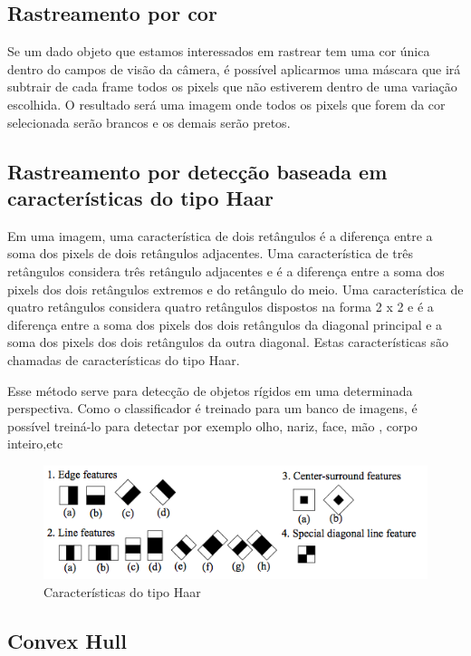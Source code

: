 \subsection{Rastreamento por cor}

Se um dado objeto que estamos interessados em rastrear tem uma cor única dentro
do campos de visão da câmera, é possível aplicarmos uma máscara que irá subtrair
de cada frame todos os pixels que não estiverem dentro de uma variação escolhida.
O resultado será uma imagem onde todos os pixels que forem da cor selecionada
serão brancos e os demais serão pretos.

\subsection{Rastreamento por detecção baseada em características do tipo Haar}

Em uma imagem,  uma característica de dois retângulos é a diferença  entre a soma
dos pixels de dois retângulos adjacentes. Uma característica de três retângulos
considera três retângulo adjacentes e é a diferença entre a soma dos pixels dos
dois retângulos extremos e do retângulo do meio. Uma característica de quatro
retângulos considera quatro retângulos dispostos na forma 2 x 2 e é a diferença
entre a soma dos pixels dos dois retângulos da diagonal principal e a soma dos
pixels dos dois retângulos da outra diagonal. Estas características são chamadas
de características do tipo Haar.

Esse método serve para detecção de objetos rígidos em uma determinada perspectiva.
Como o classificador é treinado para um banco de imagens, é possível treiná-lo
para detectar por exemplo olho, nariz, face, mão , corpo inteiro,etc

\begin{figure}[h]
    \includegraphics[scale=0.90]{imagens/haarfeatures.png}

    \caption{Características do tipo Haar}
    \label{haarfeatures}
\end{figure}

\subsection{Convex Hull}

